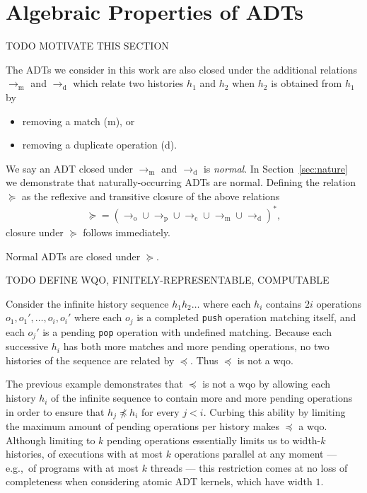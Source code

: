 \section{Algebraic Properties of ADTs}
\label{sec:algebra}

TODO MOTIVATE THIS SECTION

The ADTs we consider in this work are also closed under the additional
relations $\to_\mathrm{m}$ and $\to_\mathrm{d}$ which relate two histories
$h_1$ and $h_2$ when $h_2$ is obtained from $h_1$ by
\begin{itemize}

  \item removing a match (m), or

  \item removing a duplicate operation (d).

\end{itemize}
We say an ADT closed under $\to_\mathrm{m}$ and $\to_\mathrm{d}$ is
\emph{normal}. In Section~\ref{sec:nature} we demonstrate that
naturally-occurring ADTs are normal. Defining the relation $\succeq$ as the
reflexive and transitive closure of the above relations
\begin{align*}
  \succeq = (\to_\mathrm{o} \cup \to_\mathrm{p} \cup \to_\mathrm{c} \cup 
  \to_\mathrm{m} \cup \to_\mathrm{d})^\ast,
\end{align*}
closure under $\succeq$ follows immediately.

\begin{lemma}

  Normal ADTs are closed under $\succeq$.

\end{lemma}

TODO DEFINE WQO, FINITELY-REPRESENTABLE, COMPUTABLE

\begin{example}

  Consider the infinite history sequence $h_1 h_2 \ldots$ where each $h_i$
  contains $2i$ operations $o_1, o_1', \ldots, o_i, o_i'$ where each $o_j$ is a
  completed {\tt push} operation matching itself, and each $o_j'$ is a pending
  {\tt pop} operation with undefined matching. Because each successive $h_i$
  has both more matches and more pending operations, no two histories of the
  sequence are related by $\preceq$. Thus $\preceq$ is not a wqo.

\end{example}

The previous example demonstrates that $\preceq$ is not a wqo by allowing each
history $h_i$ of the infinite sequence to contain more and more pending
operations in order to ensure that $h_j \not\preceq h_i$ for every $j < i$.
Curbing this ability by limiting the maximum amount of pending operations per
history makes $\preceq$ a wqo. Although limiting to $k$ pending operations
essentially limits us to width-$k$ histories, of executions with at most $k$
operations parallel at any moment — e.g.,~of programs with at most $k$ threads
— this restriction comes at no loss of completeness when considering atomic ADT
kernels, which have width $1$.

